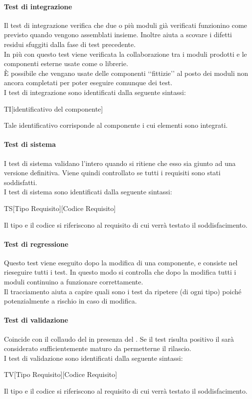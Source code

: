 			\paragraph{Test di integrazione}
				Il test di integrazione verifica che due o più moduli già verificati funzionino come previsto quando vengono assemblati insieme. Inoltre aiuta a scovare i difetti residui sfuggiti dalla fase di test precedente. \\
				In più con questo test viene verificata la collaborazione tra i moduli prodotti e le componenti esterne usate come  o librerie. \\
				È possibile che vengano usate delle componenti ‘‘fittizie’’ al posto dei moduli non ancora completati per poter eseguire comunque dei test. \\
				I test di integrazione sono identificati dalla seguente sintassi:
				\begin{center}
					TI[identificativo del componente]
				\end{center}
				Tale identificativo corrisponde al componente i cui elementi sono integrati.
			\paragraph{Test di sistema}
				I test di sistema validano l'intero   quando si ritiene che esso sia giunto ad una versione definitiva. Viene quindi controllato se tutti i requisiti sono stati soddisfatti. \\
				I test di sistema sono identificati dalla seguente sintassi:
				\begin{center}
					TS[Tipo Requisito][Codice Requisito]
				\end{center}
				Il tipo e il codice si riferiscono al requisito di cui verrà testato il soddisfacimento.
			\paragraph{Test di regressione}
				Questo test viene eseguito dopo la modifica di una componente, e consiste nel rieseguire tutti i test. In questo modo si controlla che dopo la modifica tutti i moduli continuino a funzionare correttamente. \\
				Il tracciamento aiuta a capire quali sono i test da ripetere (di ogni tipo) poiché potenzialmente a rischio in caso di modifica.
			\paragraph{Test di validazione}
				Coincide con il collaudo del  in presenza del . Se il test risulta positivo il  sarà considerato sufficientemente maturo da permetterne il rilascio. \\
				I test di validazione sono identificati dalla seguente sintassi:
				\begin{center}
					TV[Tipo Requisito][Codice Requisito]
				\end{center}
				Il tipo e il codice si riferiscono al requisito di cui verrà testato il soddisfacimento.
